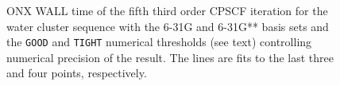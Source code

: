 \documentclass[prl,aps,twocolumn,showpacs,twocolumngrid,superbib]{revtex4}
\begin{document}
\begin{figure}[t]
  \caption{\protect
    ONX WALL time of the fifth third order CPSCF iteration for
    the water cluster sequence with the 6-31G and 6-31G** 
    basis sets and the {\tt GOOD} and {\tt TIGHT} 
    numerical thresholds (see text) controlling numerical
    precision of the result. The lines are fits to the 
    last three and four points, respectively.
  }\label{fig:Gamma_ONX_Timing}
\end{figure}




\end{document}
